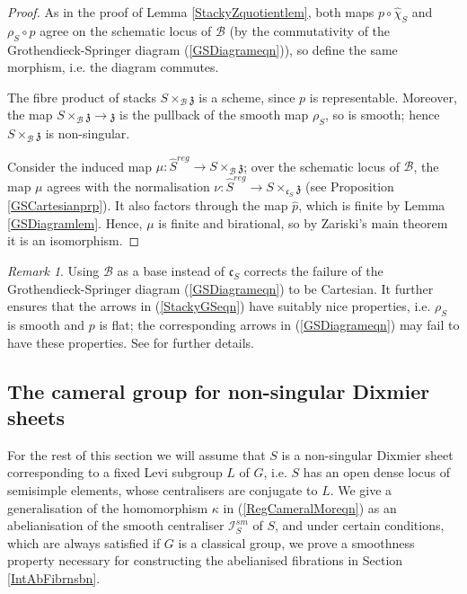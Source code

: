 \documentclass{amsart}
\theoremstyle{remark}
\newtheorem{remark}[theorem]{Remark}
\numberwithin{theorem}{section}
\numberwithin{equation}{section}
\begin{document}
\begin{proof}
As in the proof of Lemma \ref{StackyZquotientlem}, both maps $p \circ \hat{\chi}_S$ and $\rho_S \circ \hat{p}$ agree on the schematic locus of $\mathcal B$ (by the commutativity of the Grothendieck-Springer diagram (\ref{GSDiagrameqn})), so define the same morphism, i.e. the diagram commutes.

The fibre product of stacks $S \times_{\mathcal B} \mathfrak{z}$ is a scheme, since $p$ is representable. Moreover, the map $S \times_{\mathcal B} \mathfrak{z} \rightarrow \mathfrak{z}$ is the pullback of the smooth map $\rho_S$, so is smooth; hence $S \times_{\mathcal B} \mathfrak{z}$ is non-singular.

Consider the induced map $\mu:\hat{S}^{reg} \rightarrow S \times_\mathcal B \mathfrak{z}$; over the schematic locus of $\mathcal B$, the map $\mu$ agrees with the normalisation $\nu:\hat{S}^{reg} \rightarrow S \times_{\mathfrak{c}_S} \mathfrak{z}$ (see Proposition \ref{GSCartesianprp}). It also factors through the map $\hat{p}$, which is finite by Lemma \ref{GSDiagramlem}. Hence, $\mu$ is finite and birational, so by Zariski's main theorem it is an isomorphism.
\end{proof}

\begin{remark}\label{StackyGSrmk}
    Using $\mathcal B$ as a base instead of $\mathfrak{c}_S$ corrects the failure of the Grothendieck-Springer diagram (\ref{GSDiagrameqn}) to be Cartesian. It further ensures that the arrows in (\ref{StackyGSeqn}) have suitably nice properties, i.e. $\rho_S$ is smooth and $p$ is flat; the corresponding arrows in (\ref{GSDiagrameqn}) may fail to have these properties. See \cite{Broer1} for further details.
\end{remark}

\subsection{The cameral group for non-singular Dixmier sheets}\label{Camgpsbn}
For the rest of this section we will assume that $S$ is a non-singular Dixmier sheet corresponding to a fixed Levi subgroup $L$ of $G$, i.e. $S$ has an open dense locus of semisimple elements, whose centralisers are conjugate to $L$. We give a generalisation of the homomorphism $\kappa$ in (\ref{RegCameralMoreqn}) as an abelianisation of the smooth centraliser $\mathcal I^{sm}_S$ of $S$, and under certain conditions, which are always satisfied if $G$ is a classical group, we prove a smoothness property necessary for constructing the abelianised fibrations in Section \ref{IntAbFibrnsbn}.
\end{document}
